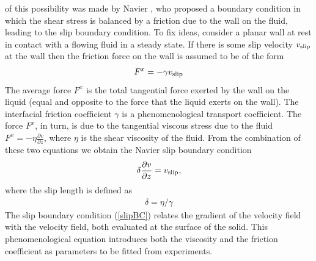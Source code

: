 \documentclass[b5paper,openright,10pt]{book}
\begin{document}
of this possibility was made  by Navier \cite{Navier1827}, who proposed
a  boundary condition  in  which the  shear stress  is  balanced by  a
friction due  to the wall on  the fluid, leading to  the slip boundary
condition.  To  fix ideas, consider a  planar wall at rest  in contact
with  a flowing  fluid  in a  steady  state.  If  there  is some  slip
velocity $  v_{\rm slip}$ at the  wall then the friction  force on the
wall is assumed to be of the form
\begin{align}
  F^x=-\gamma v_{\rm slip}
\end{align}
The average force  $F^x$ is the total tangential force  exerted by the
wall on  the liquid (equal and  opposite to the force  that the liquid
exerts   on  the   wall).    The   interfacial  friction   coefficient
$\gamma$ is a phenomenological transport coefficient.  The
force $F^x$, in  turn, is due to the tangential  viscous stress due to
the fluid  $F^x=-\eta \frac{\partial  v}{\partial z}$, where  $\eta$ is
the shear  viscosity of the fluid.  From the combination of  these two
equations we obtain the Navier slip boundary condition
\begin{align}
  \delta  \frac{\partial v}{\partial z}=v_{\rm slip},
\label{slipBC}
\end{align}
where the slip length  is defined as
\begin{align}
  \delta=\eta/\gamma
\end{align}
The slip boundary condition (\ref{slipBC}) relates the gradient of the
velocity field with the velocity  field, both evaluated at the surface
of  the solid.   This  phenomenological equation  introduces both  the
viscosity and the friction coefficient as parameters to be fitted from
experiments. 
\end{document}
